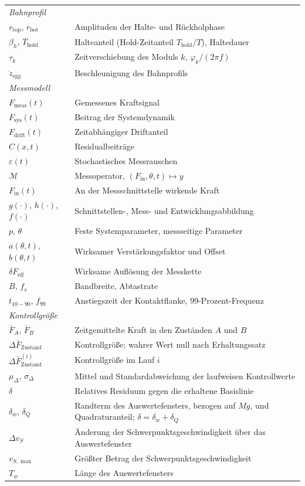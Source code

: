 \documentclass[12pt,a4paper]{report}
\begin{document}
\begin{longtable}{@{}p{}p{}@{}}
\multicolumn{2}{l}{\emph{Bahnprofil}} \\
$r_{\text{top}}$, $r_{\text{bot}}$ & Amplituden der Halte- und Rückholphase \\
$\beta_h$, $T_{\text{hold}}$ & Halteanteil (Hold-Zeitanteil $T_{\text{hold}}/T$), Haltedauer \\
$\tau_k$ & Zeitverschiebung des Moduls $k$, $\varphi_k/(2\pi f)$ \\
$\ddot{z}_{\text{egg}}$ & Beschleunigung des Bahnprofils \\

\multicolumn{2}{l}{\emph{Messmodell}} \\
$F_{\text{meas}}(t)$ & Gemessenes Kraftsignal \\
$F_{\text{sys}}(t)$ & Beitrag der Systemdynamik \\
$F_{\text{drift}}(t)$ & Zeitabhängiger Driftanteil \\
$C(x,t)$ & Residualbeiträge \\
$\varepsilon(t)$ & Stochastisches Messrauschen \\
$\mathcal{M}$ & Messoperator, $(F_{\text{in}},\theta,t)\mapsto y$ \\
$F_{\text{in}}(t)$ & An der Messschnittstelle wirkende Kraft \\
$g(\cdot)$, $h(\cdot)$, $f(\cdot)$ & Schnittstellen-, Mess- und Entwicklungsabbildung \\
$p$, $\theta$ & Feste Systemparameter, messseitige Parameter \\
$a(\theta,t)$, $b(\theta,t)$ & Wirksamer Verstärkungsfaktor und Offset \\
$\delta F_{\text{eff}}$ & Wirksame Auflösung der Messkette \\
$B$, $f_s$ & Bandbreite, Abtastrate \\
$t_{10-90}$, $f_{99}$ & Anstiegszeit der Kontaktflanke, 99-Prozent-Frequenz \\

\multicolumn{2}{l}{\emph{Kontrollgröße}} \\
$\bar{F}_{A}$, $\bar{F}_{B}$ & Zeitgemittelte Kraft in den Zuständen $A$ und $B$ \\
$\Delta \bar{F}_{\text{Zustand}}$ & Kontrollgröße; wahrer Wert null nach Erhaltungssatz \\
$\Delta \bar{F}^{(i)}_{\text{Zustand}}$ & Kontrollgröße im Lauf $i$ \\
$\mu_{\Delta}$, $\sigma_{\Delta}$ & Mittel und Standardabweichung der laufweisen Kontrollwerte \\
$\delta$ & Relatives Residuum gegen die erhaltene Basislinie \\
$\delta_w$, $\delta_Q$ & Randterm des Auswertefensters, bezogen auf $Mg$, und Quadraturanteil; $\delta = \delta_w + \delta_Q$ \\
$\Delta v_S$ & Änderung der Schwerpunktsgeschwindigkeit über das Auswertefenster \\
$v_{S,\max}$ & Größter Betrag der Schwerpunktsgeschwindigkeit \\
$T_w$ & Länge des Auswertefensters \\


\end{longtable}
\end{document}
